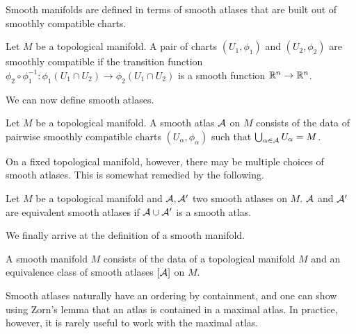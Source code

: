 Smooth manifolds are defined in terms of smooth atlases that are built out of smoothly compatible charts. 
\begin{definition}\label{def: smoothly compatible charts}
    Let $M$ be a topological manifold. A pair of charts $(U_{1},\phi_{1})$ and $(U_{2},\phi_{2})$ are smoothly compatible if the transition function $\phi_{2}\circ\phi_{1}^{-1}:\phi_{1}(U_{1}\cap U_{2})\to\phi_{2}(U_{1}\cap U_{2})$ is a smooth function $\mathbb{R}^{n}\to\mathbb{R}^{n}$. 
\end{definition}
We can now define smooth atlases. 
\begin{definition}\label{def: smooth atlas}
    Let $M$ be a topological manifold. A smooth atlas $\mathcal{A}$ on $M$ consists of the data of pairwise smoothly compatible charts $(U_{\alpha},\phi_{\alpha})$ such that $\bigcup_{\alpha\in\mathcal{A}}U_{\alpha}=M$. 
\end{definition}
On a fixed topological manifold, however, there may be multiple choices of smooth atlases. This is somewhat remedied by the following. 
\begin{definition}\label{def: equivalent atlases}
    Let $M$ be a topological manifold and $\mathcal{A},\mathcal{A}'$ two smooth atlases on $M$. $\mathcal{A}$ and $\mathcal{A}'$ are equivalent smooth atlases if $\mathcal{A}\cup\mathcal{A}'$ is a smooth atlas. 
\end{definition}
We finally arrive at the definition of a smooth manifold. 
\begin{definition}\label{def: smooth manifold}
    A smooth manifold $M$ consists of the data of a topological manifold $M$ and an equivalence class of smooth atlases $[\mathcal{A}]$ on $M$. 
\end{definition}
\begin{remark}
    Smooth atlases naturally have an ordering by containment, and one can show using Zorn's lemma that an atlas is contained in a maximal atlas. In practice, however, it is rarely useful to work with the maximal atlas. 
\end{remark}